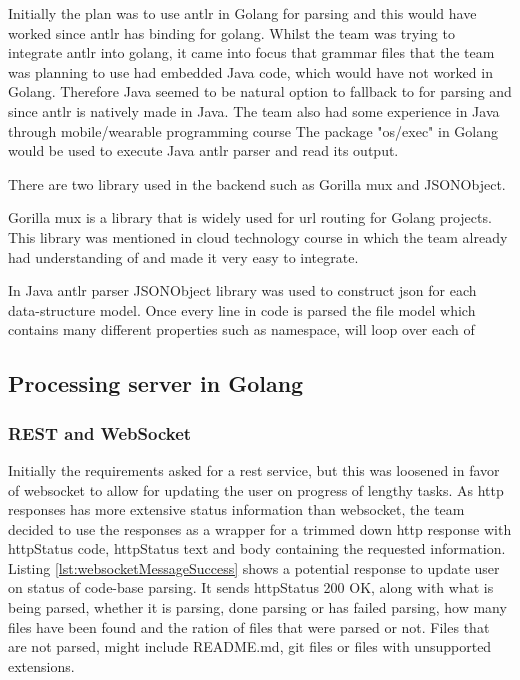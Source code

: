 Initially the plan was to use \gls{antlr} in Golang for parsing and this would have worked since \gls{antlr} has binding for golang. Whilst the team was trying to integrate \gls{antlr} into golang, it came into focus that grammar files that the team was planning to use had embedded Java code, which would have not worked in Golang. Therefore Java seemed to be natural option to fallback to for parsing and since \gls{antlr} is natively made in Java. The team also had some experience in Java through mobile/wearable programming course \cite{course:mobileWearable} The package "os/exec" in Golang would be used to execute Java \gls{antlr} parser and read its output.

There are two library used in the \gls{backend} such as Gorilla mux and JSONObject.

Gorilla mux is a library that is widely used for \gls{url} routing for Golang projects. This library was mentioned in cloud technology course \cite{course:cloud} in which the team already had understanding of and made it very easy to integrate. 

In Java \gls{antlr} parser JSONObject library was used to construct \gls{json} for each data-structure model. Once every line in code is parsed the file model which contains many different properties such as namespace, will loop over each of
 



\subsection{Processing server in Golang}    \label{subsection:golang}

\subsubsection{REST and WebSocket}

Initially the requirements asked for a \gls{rest} service, but this was loosened in favor of \gls{websocket} to allow for updating the user on progress of lengthy tasks. As \gls{http} responses has more extensive status information than \gls{websocket}, the team decided to use the responses as a wrapper for a trimmed down \gls{http} response with \gls{http}Status code, \gls{http}Status text and body containing the requested information. Listing \ref{lst:websocketMessageSuccess} shows a potential response to update user on status of code-base parsing. It sends \gls{http}Status 200 OK, along with what is being parsed, whether it is parsing, done parsing or has failed parsing, how many files have been found and the ration of files that were parsed or not. Files that are not parsed, might include README.md, \gls{git} files or files with unsupported extensions.  

